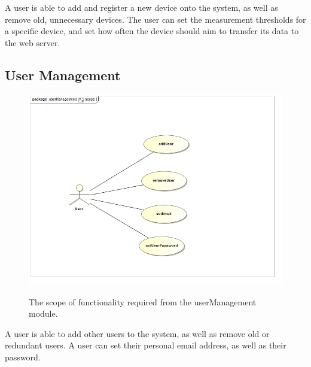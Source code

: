 \documentclass[paper=a4, fontsize=11pt]{scrartcl} %
\begin{document}
		A user is able to add and register a new device onto the system, as well as remove old, unnecessary devices. The user can set the measurement thresholds for a specific device, and set how often the device should aim to transfer its data to the web server.
		
	\subsection{User Management}
		\begin{figure}[H]
			\includegraphics[width=\textwidth]{images/userManagementScope.jpg}  \\
			\caption{The scope of functionality required from the userManagement module.}
		\end{figure}
		
		A user is able to add other users to the system, as well as remove old or redundant users. A user can set their personal email address, as well as their password.
		
\end{document}

